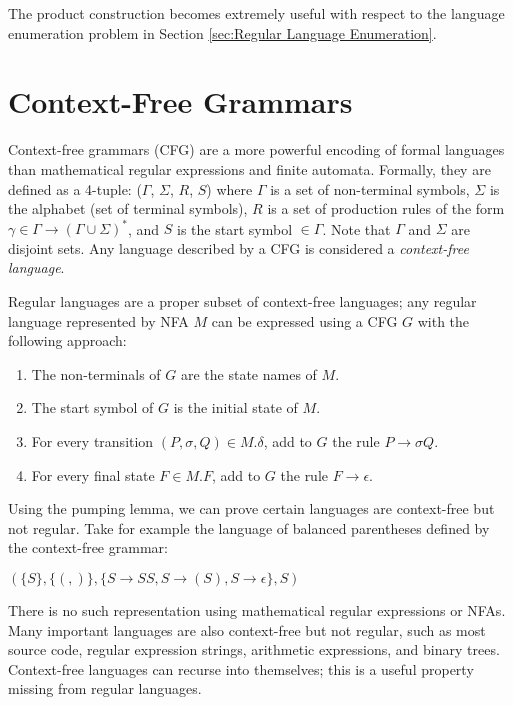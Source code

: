 The product construction becomes extremely useful with respect to the language enumeration problem in Section \ref{sec:Regular Language Enumeration}.





\section{Context-Free Grammars}
\label{sec:Context-Free Grammars}
Context-free grammars (CFG) are a more powerful encoding of formal languages than mathematical regular expressions and finite automata. Formally, they are defined as a 4-tuple: ($\Gamma$, $\Sigma$, $R$, $S$) where $\Gamma$ is a set of non-terminal symbols, $\Sigma$ is the alphabet (set of terminal symbols), $R$ is a set of production rules of the form $\gamma \in \Gamma \rightarrow (\Gamma \cup \Sigma)^*$, and $S$ is the start symbol $\in \Gamma$. Note that $\Gamma$ and $\Sigma$ are disjoint sets. Any language described by a CFG is considered a \emph{context-free language}. 

Regular languages are a proper subset of context-free languages; any regular language represented by NFA $M$ can be expressed using a CFG $G$ with the following approach: 
\begin{enumerate}
  \item The non-terminals of $G$ are the state names of $M$.
  \item The start symbol of $G$ is the initial state of $M$.
  \item For every transition $(P, \sigma, Q) \in M.\delta$, add to $G$ the rule $P \rightarrow \sigma Q$.
  \item For every final state $F \in M.F$, add to $G$ the rule $F \rightarrow \epsilon$.
\end{enumerate} 
Using the pumping lemma, we can prove certain languages are context-free but not regular. Take for example the language of balanced parentheses defined by the context-free grammar:
\begin{center}
  $(\{S\}, \{(, )\}, \{S \rightarrow SS, S \rightarrow (S), S \rightarrow \epsilon\}, S)$  
\end{center}
There is no such representation using mathematical regular expressions or NFAs. Many important languages are also context-free but not regular, such as most source code, regular expression strings, arithmetic expressions, and binary trees. Context-free languages can recurse into themselves; this is a useful property missing from regular languages.

